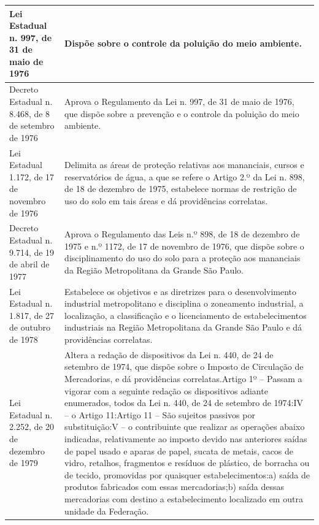 \begin{center}
\begin{longtable}{|p{}|p{}|}
			\hline
			Lei Estadual n.  997, de 31 de maio de 1976 & Dispõe sobre o controle da poluição do meio ambiente. \\
			\hline
			Decreto  Estadual  n.  8.468,  de 8 de setembro de 1976 & Aprova o Regulamento da Lei n. 997, de 31 de maio de 1976, que dispõe sobre a prevenção e o controle da poluição do meio ambiente. \\
			\hline
			Lei  Estadual  1.172,  de  17  de novembro de 1976 & Delimita as áreas de proteção relativas aos mananciais, cursos e reservatórios de água, a que se refere o Artigo 2.º da Lei n. 898, de 18 de dezembro de 1975, estabelece normas de restrição de uso do solo em tais áreas e dá providências correlatas. \\
			\hline
			Decreto  Estadual  n.  9.714,  de 19 de abril de 1977 & Aprova o Regulamento das Leis n.º 898, de 18 de dezembro de 1975 e n.º 1172, de 17 de novembro de 1976, que dispõe sobre o disciplinamento do uso do solo para a proteção aos mananciais da Região Metropolitana da Grande São Paulo. \\
			\hline
			Lei Estadual n. 1.817, de 27 de outubro de 1978 & Estabelece   os   objetivos   e  as   diretrizes   para   o  desenvolvimento  industrial metropolitano e disciplina o zoneamento industrial, a localização, a classificação e  o  licenciamento  de  estabelecimentos  industriais  na  Região  Metropolitana da Grande São Paulo e dá providências correlatas. \\
			\hline
			Lei Estadual n. 2.252, de 20 de dezembro de 1979 & Altera a redação de dispositivos da Lei n. 440, de 24 de setembro de 1974, que dispõe  sobre  o  Imposto  de  Circulação  de  Mercadorias,  e  dá  providências correlatas.\newline{}Artigo  1º  –  Passam  a  vigorar  com  a  seguinte  redação  os  dispositivos  adiante enumerados, todos da Lei n. 440, de 24 de setembro de 1974:\newline{}IV – o Artigo 11:\newline{}Artigo 11 – São sujeitos passivos por substituição:\newline{}V – o contribuinte que realizar as operações abaixo indicadas, relativamente ao imposto devido nas anteriores saídas de papel usado e aparas de papel, sucata de  metais,  cacos  de  vidro,  retalhos,  fragmentos  e  resíduos  de  plástico,  de borracha ou de tecido, promovidas por quaisquer estabelecimentos:\newline{}a) saída de produtos fabricados com essas mercadorias;\newline{}b) saída dessas mercadorias com destino a estabelecimento localizado em outra unidade da Federação. \\

\end{longtable}
\end{center}
